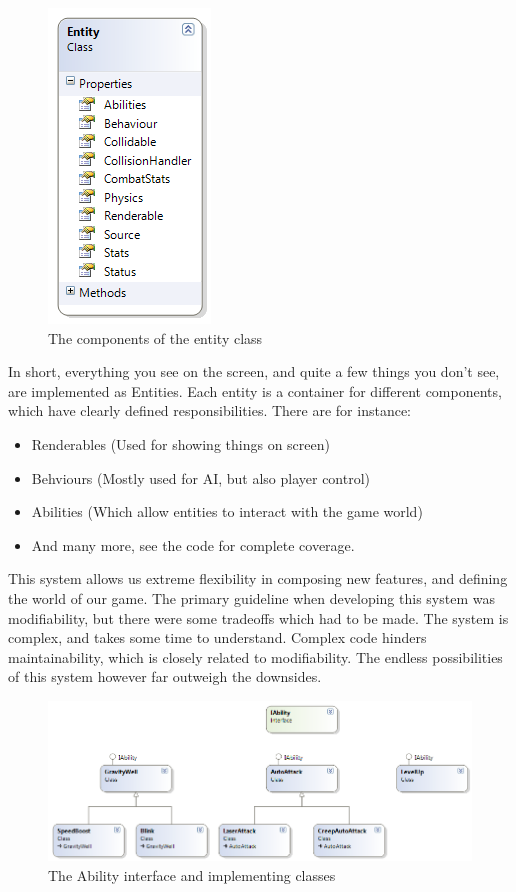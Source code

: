 \begin{figure}
    \begin{center}
    \includegraphics[scale=1]{graphics/entity}
    \caption{The components of the entity class}
    \label{fig:entity}
    \end{center}
\end{figure}

In short, everything you see on the screen, and quite a few things you don't
see, are implemented as Entities. Each entity is a container for different
components, which have clearly defined responsibilities. There are for 
instance:
\begin{itemize}
    \item Renderables (Used for showing things on screen)
    \item Behviours (Mostly used for AI, but also player control)
    \item Abilities (Which allow entities to interact with the game world)
    \item And many more, see the code for complete coverage.
\end{itemize}

This system allows us extreme flexibility in composing new features, and 
defining the world of our game. The primary guideline when developing this
system was modifiability, but there were some tradeoffs which had to be made.
The system is complex, and takes some time to understand. Complex code hinders
maintainability, which is closely related to modifiability. The endless 
possibilities of this system however far outweigh the downsides.

\begin{figure}
    \begin{center}
    \includegraphics[width=\linewidth]{graphics/abilities}
    \caption{The Ability interface and implementing classes}
    \label{fig:abilities}
    \end{center}
\end{figure}

